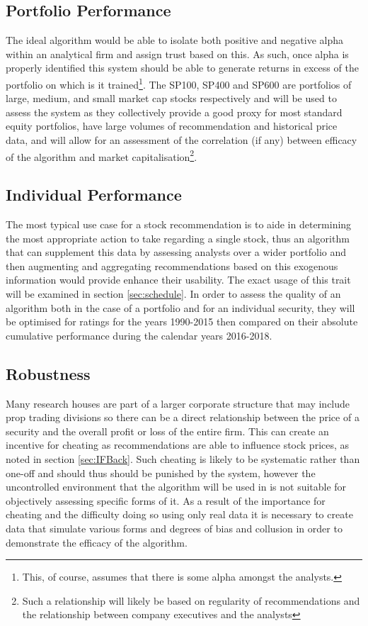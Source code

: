 \subsection{Portfolio Performance}
The ideal algorithm would be able to isolate both positive and negative alpha within an analytical firm and assign trust based on this. As such, once alpha is properly identified this system should be able to generate returns in excess of the portfolio on which is it trained\footnote{This, of course, assumes that there is some alpha amongst the analysts.}. The SP100, SP400 and SP600 are portfolios of large, medium, and small market cap stocks respectively and will be used to assess the system as they collectively provide a good proxy for most standard equity portfolios, have large volumes of recommendation and historical price data, and will allow for an assessment of the correlation (if any) between efficacy of the algorithm and market capitalisation\footnote{Such a relationship will likely be based on regularity of recommendations and the relationship between company executives and the analysts}.


\subsection{Individual Performance}
The most typical use case for a stock recommendation is to aide in determining the most appropriate action to take regarding a single stock, thus an algorithm that can supplement this data by assessing analysts over a wider portfolio and then augmenting and aggregating recommendations based on this exogenous information would provide enhance their usability. The exact usage of this trait will be examined in section \ref{sec:schedule}. In order to assess the quality of an algorithm both in the case of a portfolio and for an individual security, they will be optimised for ratings for the years 1990-2015 then compared on their absolute cumulative performance during the calendar years 2016-2018. 

\subsection{Robustness}
Many research houses are part of a larger corporate structure that may include prop trading divisions so there can be a direct relationship between the price of a security and the overall profit or loss of the entire firm. This can create an incentive for cheating as recommendations are able to influence stock prices, as noted in section \ref{sec:IFBack}. Such cheating is likely to be systematic rather than one-off and should thus should be punished by the system, however the uncontrolled environment that the algorithm will be used in is not suitable for objectively assessing specific forms of it. 
As a result of the importance for cheating and the difficulty doing so using only real data it is necessary to create data that simulate various forms and degrees of bias and collusion in order to demonstrate the efficacy of the algorithm.


